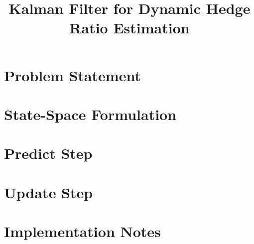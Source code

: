 \documentclass[11pt]{article}
\title{Kalman Filter for Dynamic Hedge Ratio Estimation}
\author{}
\date{}
\begin{document}
\maketitle


\section{Problem Statement}

\section{State-Space Formulation}

\section{Predict Step}

\section{Update Step}

\section{Implementation Notes}
\end{document}
